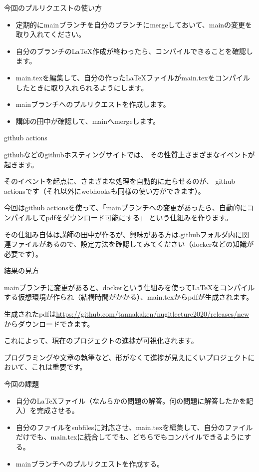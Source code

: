 \documentclass[12pt, unicode]{beamer}
\begin{document}
\begin{frame}{今回のプルリクエストの使い方}

\begin{itemize}
\item 定期的にmainブランチを自分のブランチにmergeしておいて、mainの変更を取り入れてください。
\item 自分のブランチのLaTeX作成が終わったら、コンパイルできることを確認します。
\item main.texを編集して、自分の作ったLaTeXファイルがmain.texをコンパイルしたときに取り入れられるようにします。
\item mainブランチへのプルリクエストを作成します。
\item 講師の田中が確認して、mainへmergeします。
\end{itemize}

\end{frame}
\begin{frame}{github actions}

githubなどのgithubホスティングサイトでは、
その性質上さまざまなイベントが起きます。

そのイベントを起点に、さまざまな処理を自動的に走らせるのが、
github actionsです（それ以外にwebhooksも同様の使い方ができます）。

今回はgithub actionsを使って、「mainブランチへの変更があったら、自動的にコンパイルしてpdfをダウンロード可能にする」
という仕組みを作ります。


その仕組み自体は講師の田中が作るが、興味がある方は.githubフォルダ内に関連ファイルがあるので、設定方法を確認してみてください（dockerなどの知識が必要です）。

\end{frame}
\begin{frame}{結果の見方}

mainブランチに変更があると、dockerという仕組みを使って\LaTeX をコンパイルする仮想環境が作られ（結構時間がかかる）、main.texからpdfが生成されます。

生成されたpdfは\url{https://github.com/tannakaken/nugitlecture2020/releases/new}からダウンロードできます。

これによって、現在のプロジェクトの進捗が可視化されます。

プログラミングや文章の執筆など、形がなくて進捗が見えにくいプロジェクトにおいて、これは重要です。
\end{frame}

\begin{frame}{今回の課題}

\begin{itemize}
\item 自分の\LaTeX ファイル（なんらかの問題の解答。何の問題に解答したかを記入）を完成させる。
\item 自分のファイルをsubfilesに対応させ、main.texを編集して、自分のファイルだけでも、main.texに統合してでも、どちらでもコンパイルできるようにする。
\item mainブランチへのプルリクエストを作成する。
\end{itemize}
\end{frame}
\end{document}
